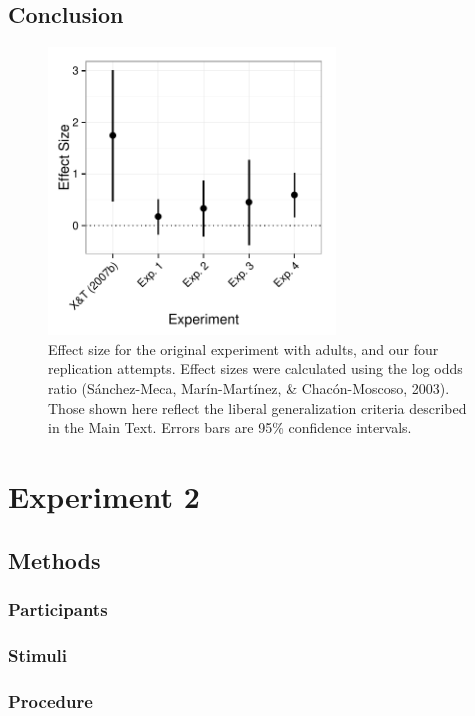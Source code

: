 \documentclass[man]{apa2}
\begin{document}
\subsection{Conclusion}

 \begin{figure} [t]
  \includegraphics[width=3in]{figures/FIG_3.pdf} 
  \caption{\label{fig:effect_sizes} Effect size for the original experiment with adults, and our four replication attempts.  Effect sizes were calculated using the log odds ratio (S\'{a}nchez-Meca, Mar\'{i}n-Mart\'{i}nez, \& Chac\'{o}n-Moscoso, 2003). Those shown here reflect the liberal generalization criteria described in the Main Text. Errors bars are 95\% confidence intervals. } 
\end{figure}




\section{Experiment 2}

\subsection{Methods}

\subsubsection{Participants} 
\subsubsection{Stimuli}



\subsubsection{Procedure}
\end{document}
